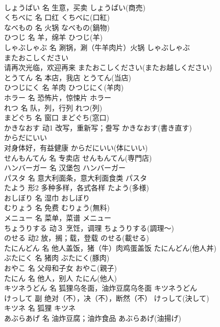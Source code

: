 \documentclass[8pt]{extreport}
\begin{document}
\begin{CJK}{UTF8}{min}
\\	しょうばい	名	生意，买卖	しょうばい(商売)	
\\	くちべに	名	口红	くちべに(口紅)	
\\	なべもの	名	火锅	なべもの(鍋物)	
\\	ひつじ	名	羊，绵羊	ひつじ(羊)	
\\	しゃぶしゃぶ	名	涮锅，涮（牛羊肉片）火锅	しゃぶしゃぶ	
\\	またおこしください	
\\	请再次光临，欢迎再来	またおこしください(またお越しください)	
\\	とうてん	名	本店，我店	とうてん(当店)	
\\	ひつじにく	名	羊肉	ひつじにく(羊肉)	
\\	ホラー	名	恐怖片，惊悚片	ホラー	
\\	れつ	名	队，列，行列	れつ(列)	
\\	まどぐち	名	窗口	まどぐち(窓口)	
\\	かきなおす	动1	改写，重新写；誊写	かきなおす(書き直す)	
\\	からだにいい	
\\	对身体好，有益健康	からだにいい(体にいい)	
\\	せんもんてん	名	专卖店	せんもんてん(専門店)	
\\	ハンバーガー	名	汉堡包	ハンバーガー	
\\	パスタ	名	意大利面条，意大利面食类	パスタ	
\\	たよう	形2	多种多样，各式各样	たよう(多様)	
\\	おしぼり	名	湿巾	おしぼり	
\\	むりょう	名	免费	むりょう(無料)	
\\	メニュー	名	菜单，菜谱	メニュー	
\\	ちょうりする	动３	烹饪，调理	ちょうりする(調理～)	
\\	のせる	动2	放，搁；载，登载	のせる(載せる)	
\\	たにんどん	名	他人盖饭，猪（牛）肉鸡蛋盖饭	たにんどん(他人丼)	
\\	ぶたにく	名	猪肉	ぶたにく(豚肉)	
\\	おやこ	名	父母和子女	おやこ(親子)	
\\	たにん	名	他人，别人	たにん(他人)	
\\	キツネうどん	名	狐狸乌冬面，油炸豆腐乌冬面	キツネうどん	
\\	けっして	副	绝对（不），决（不），断然（不）	けっして(決して)	
\\	キツネ	名	狐狸	キツネ	
\\	あぶらあげ	名	油炸豆腐；油炸食品	あぶらあげ(油揚げ)	

\end{CJK}
\end{document}
